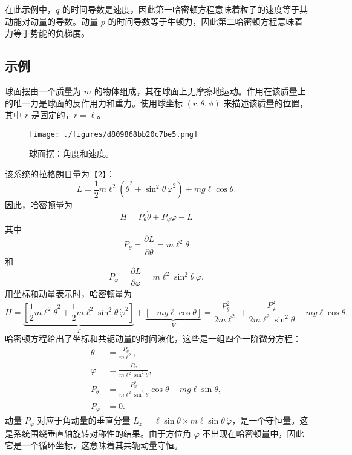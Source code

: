 在此示例中，\( q \) 的时间导数是速度，因此第一哈密顿方程意味着粒子的速度等于其动能对动量的导数。动量 \( p \) 的时间导数等于牛顿力，因此第二哈密顿方程意味着力等于势能的负梯度。
\subsection{示例}   
球面摆由一个质量为 \( m \) 的物体组成，其在球面上无摩擦地运动。作用在该质量上的唯一力是球面的反作用力和重力。使用球坐标 \( (r, \theta, \phi) \) 来描述该质量的位置，其中 \( r \) 是固定的，\( r = \ell \)。
\begin{figure}[ht]
\centering
\texttt{[image: ./figures/d809868bb20c7be5.png]}
\caption{球面摆：角度和速度。} \label{fig_HMD_2}
\end{figure}
该系统的拉格朗日量为【2】：
\[
L = \frac{1}{2}m\ell^2\left(\dot{\theta}^2 + \sin^2 \theta \, \dot{\varphi}^2\right) + mg\ell \cos \theta.~
\]
因此，哈密顿量为
\[
H = P_{\theta} \dot{\theta} + P_{\varphi} \dot{\varphi} - L~
\]
其中
\[
P_{\theta} = \frac{\partial L}{\partial \dot{\theta}} = m\ell^2 \dot{\theta}~
\]
和
\[
P_{\varphi} = \frac{\partial L}{\partial \dot{\varphi}} = m\ell^2 \sin^2 \theta \, \dot{\varphi}.~
\]
用坐标和动量表示时，哈密顿量为
\[
H = \underbrace{\left[\frac{1}{2}m\ell^2 \dot{\theta}^2 + \frac{1}{2}m\ell^2 \sin^2 \theta \, \dot{\varphi}^2 \right]}_{T} + \underbrace{\left[-mg\ell \cos \theta \right]}_{V} = \frac{P_{\theta}^2}{2m\ell^2} + \frac{P_{\varphi}^2}{2m\ell^2 \sin^2 \theta} - mg\ell \cos \theta.~
\]
哈密顿方程给出了坐标和共轭动量的时间演化，这些是一组四个一阶微分方程：
\[
\begin{aligned}
\dot{\theta} &= \frac{P_{\theta}}{m\ell^2}, \\
\dot{\varphi} &= \frac{P_{\varphi}}{m\ell^2 \sin^2 \theta}, \\
\dot{P_{\theta}} &= \frac{P_{\varphi}^2}{m\ell^2 \sin^3 \theta} \cos \theta - mg\ell \sin \theta, \\
\dot{P_{\varphi}} &= 0.
\end{aligned}~
\]
动量 \( P_{\varphi} \) 对应于角动量的垂直分量 \( L_z = \ell \sin \theta \times m\ell \sin \theta \, \dot{\varphi} \)，是一个守恒量。这是系统围绕垂直轴旋转对称性的结果。由于方位角 \( \varphi \) 不出现在哈密顿量中，因此它是一个循环坐标，这意味着其共轭动量守恒。
